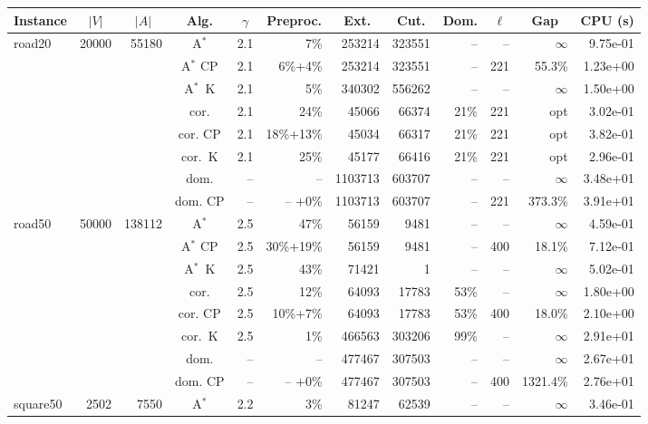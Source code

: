 \documentclass[11pt]{amsart}
\newenvironment{outdent}
{\begin{list}{}{\leftmargin-2cm\rightmargin\leftmargin}\centering\item\relax}
{\end{list}\ignorespacesafterend}
\theoremstyle{plain}
\theoremstyle{remark}
\begin{document}
\begin{table}
\begin{outdent}
\begin{footnotesize}
\begin{tabular}{|l|rrc|rr|rrr|rr|r|}
\hline
Instance 
& \multicolumn{1}{c}{$|V|$} 
& \multicolumn{1}{c}{$|A|$} 
& \multicolumn{1}{c|}{Alg.} 
& \multicolumn{1}{c}{$\gamma$} 
& \multicolumn{1}{c|}{Preproc.} 
& \multicolumn{1}{c}{Ext.} 
& \multicolumn{1}{c}{Cut.} 
& \multicolumn{1}{c|}{Dom.} 
& \multicolumn{1}{c}{$\ell$} 
& \multicolumn{1}{c|}{Gap} 
& \multicolumn{1}{c|}{CPU (s)} \\
\hline
road20 & 20000 & 55180 & A$^*$ & 2.1 & 7\% &253214 & 323551 & -- & -- &$\infty$ & 9.75e-01 \\
&&&A$^*$ CP & 2.1 & 6\%+4\% &253214 & 323551 & -- &221 & 55.3\% & 1.23e+00 \\
&&&A$^*$~K & 2.1 & 5\% &340302 & 556262 & -- & -- &$\infty$ & 1.50e+00 \\
&&&cor. & 2.1 & 24\% &45066 & 66374 & 21\% &221 & opt & 3.02e-01 \\
&&&cor. CP & 2.1 & 18\%+13\% &45034 & 66317 & 21\% &221 & opt & 3.82e-01 \\
&&&cor.~K & 2.1 & 25\% &45177 & 66416 & 21\% &221 & opt & 2.96e-01 \\
&&&dom. & -- & --  &1103713 & 603707 & -- & -- &$\infty$ & 3.48e+01 \\
&&&dom. CP & -- & -- +0\% &1103713 & 603707 & -- &221 & 373.3\% & 3.91e+01 \\
\hline
road50 & 50000 & 138112 & A$^*$ & 2.5 & 47\% &56159 & 9481 & -- & -- &$\infty$ & 4.59e-01 \\
&&&A$^*$ CP & 2.5 & 30\%+19\% &56159 & 9481 & -- &400 & 18.1\% & 7.12e-01 \\
&&&A$^*$~K & 2.5 & 43\% &71421 & 1 & -- & -- &$\infty$ & 5.02e-01 \\
&&&cor. & 2.5 & 12\% &64093 & 17783 & 53\% & -- &$\infty$ & 1.80e+00 \\
&&&cor. CP & 2.5 & 10\%+7\% &64093 & 17783 & 53\% &400 & 18.0\% & 2.10e+00 \\
&&&cor.~K & 2.5 & 1\% &466563 & 303206 & 99\% & -- &$\infty$ & 2.91e+01 \\
&&&dom. & -- & --  &477467 & 307503 & -- & -- &$\infty$ & 2.67e+01 \\
&&&dom. CP & -- & -- +0\% &477467 & 307503 & -- &400 & 1321.4\% & 2.76e+01 \\
\hline
square50 & 2502 & 7550 & A$^*$ & 2.2 & 3\% &81247 & 62539 & -- & -- &$\infty$ & 3.46e-01 \\

\end{tabular}
\end{footnotesize}
\end{outdent}
\end{table}
\end{document}
